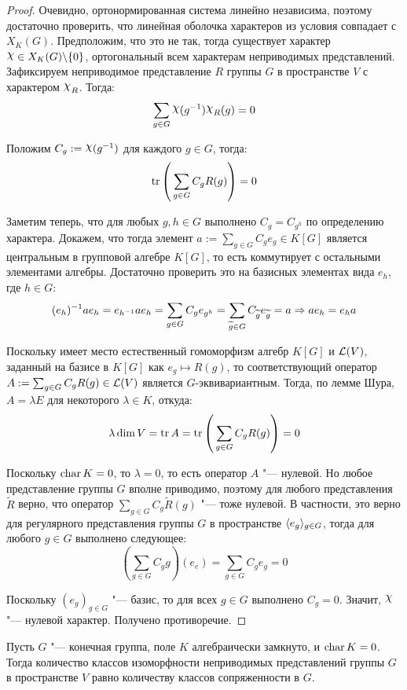 \begin{proof}
	Очевидно, ортонормированная система линейно независима, поэтому достаточно проверить, что линейная оболочка характеров из условия совпадает с $X_K(G)$. Предположим, что это не так, тогда существует характер $\Chi \in X_K(G)\bs\{0\}$, ортогональный всем характерам неприводимых представлений. Зафиксируем неприводимое представление $R$ группы $G$ в пространстве $V$ с характером $\Chi_R$. Тогда:
	\[\sum_{g \in G}\Chi{(g^{-1})}\Chi_R(g) = 0\]
	
	Положим $C_g := \Chi(g^{-1})$ для каждого $g \in G$, тогда:
	\[\operatorname{tr}\left(\,\sum_{g \in G}C_g R(g)\right) = 0\]
	
	Заметим теперь, что для любых $g, h \in G$ выполнено $C_{g} = C_{g^h}$ по определению характера. Докажем, что тогда элемент $a := \sum_{g \in G}C_ge_g \in K[G]$ является центральным в групповой алгебре $K[G]$, то есть коммутирует с остальными элементами алгебры. Достаточно проверить это на базисных элементах вида $e_h$, где $h \in G$:
	\[(e_{h})^{-1}ae_h = e_{h^{-1}}ae_h = \sum_{g \in G}C_ge_{g^h} = \sum_{\widetilde g \in G}C_{\widetilde g}e_{\widetilde g} = a \Rightarrow ae_h = e_ha\]
	
	Поскольку имеет место естественный гомоморфизм алгебр $K[G]$ и $\mathcal L(V)$, заданный на базисе в $K[G]$ как $e_g \mapsto R(g)$, то соответствующий оператор $A := \sum_{g \in G}C_gR(g) \in \mathcal L(V)$ является $G$-эквивариантным. Тогда, по лемме Шура, $A = \lambda E$ для некоторого $\lambda \in K$, откуда:
	\[\lambda\dim{V} = \operatorname{tr}{A} = \operatorname{tr}\left(\,\sum_{g \in G}C_gR(g)\right) = 0\]
	
	Поскольку $\operatorname{char}{K} = 0$, то $\lambda = 0$, то есть оператор $A$ "--- нулевой. Но любое представление группы $G$ вполне приводимо, поэтому для любого представления $\widetilde R$ верно, что оператор $\sum_{g \in G}C_g\widetilde R(g)$ "--- тоже нулевой. В частности, это верно для регулярного представления группы $G$ в пространстве $\langle e_g \rangle_{g \in G}$, тогда для любого $g \in G$ выполнено следующее:
	\[\left(\sum_{g \in G}C_gg\right)(e_e) = \sum_{g \in G}C_ge_g = 0\]
	
	Поскольку $(e_g)_{g \in G}$ "--- базис, то для всех $g \in G$ выполнено $C_g = 0$. Значит, $\Chi$ "--- нулевой характер. Получено противоречие.	
\end{proof}

\begin{corollary}
	Пусть $G$ "--- конечная группа, поле $K$ алгебраически замкнуто, и $\operatorname{char}{K} = 0$. Тогда количество классов изоморфности неприводимых представлений группы $G$ в пространстве $V$ равно количеству классов сопряженности в $G$.
\end{corollary}

